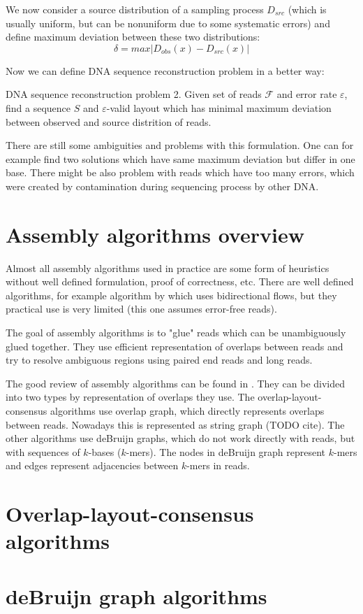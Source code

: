 We now consider a source distribution of a sampling process $D_{src}$ (which is usually
uniform, but can be nonuniform due to some systematic errors) and define maximum
deviation between these two distributions:
$$\delta = max |D_{obs}(x) - D_{src}(x)|$$

Now we can define DNA sequence reconstruction problem in a better way:

\begin{definition}{DNA sequence reconstruction problem 2.}
Given set of reads $\mathcal{F}$ and error rate $\varepsilon$, find
a sequence $S$ and $\varepsilon$-valid layout which has minimal
maximum deviation between observed and source distrition of reads.
\end{definition}

There are still some ambiguities and problems with this formulation.
One can for example find two solutions which have same maximum deviation
but differ in one base. There might be also problem with reads which have too many errors,
which were created by contamination during sequencing process by other DNA.

\section{Assembly algorithms overview}

Almost all assembly algorithms used in practice are some form of heuristics
without well defined formulation, proof of correctness, etc.
There are well defined algorithms, for example algorithm by \cite{Medvedev2009}
which uses bidirectional flows, but they practical use is very limited (this one
assumes error-free reads).

The goal of assembly algorithms is to "glue" reads which can be unambiguously glued together.
They use efficient representation of overlaps between reads and try to resolve
ambiguous regions using paired end reads and long reads.

The good review of assembly algorithms can be found in \cite{miller2010assembly}.
They can be divided into two types by representation of overlaps they use.
The overlap-layout-consensus algorithms use overlap graph, which directly represents
overlaps between reads. Nowadays this is represented as string graph (TODO cite).
The other algorithms use deBruijn graphs, which do not work directly with reads, but
with sequences of $k$-bases ($k$-mers). The nodes in deBruijn graph represent $k$-mers
and edges represent adjacencies between $k$-mers in reads. 

\section{Overlap-layout-consensus algorithms}

\section{deBruijn graph algorithms}
